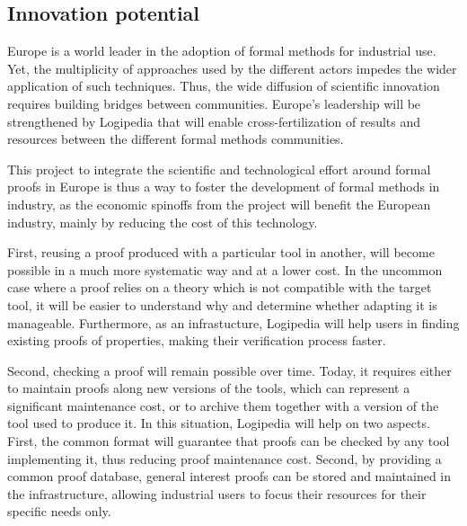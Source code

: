\subsection*{Innovation potential}

Europe is a world leader in the adoption of formal methods for
industrial use. Yet, the multiplicity of approaches used by the
different actors impedes the wider application of such
techniques. Thus, the wide diffusion of scientific innovation requires
building bridges between communities. Europe's leadership will be
strengthened by Logipedia that will enable cross-fertilization of
results and resources between the different formal methods
communities.

This project to integrate the scientific and technological effort
around formal proofs in Europe is thus a way to foster the development
of formal methods in industry, as the economic spinoffs from the
project will benefit the European industry, mainly by reducing the
cost of this technology. 

First, reusing a proof produced with a particular tool in another, 
will become possible in a much more systematic way and at a
lower cost. In the uncommon case where a proof relies on a theory
which is not compatible with the target tool, it will be easier to
understand why and determine whether adapting it is manageable.
Furthermore, as an infrastucture, Logipedia will help users
in finding existing proofs of properties, making their verification
process faster.

Second, checking a proof will remain possible over time. Today, it
requires either to maintain proofs along new versions of the tools,
which can represent a significant maintenance cost, or to archive
them together with a version of the tool used to produce it. In this
situation, Logipedia will help on two aspects. First, the
common format will guarantee that proofs can be checked by any tool
implementing it, thus reducing proof maintenance cost. Second, by
providing a common proof database, general interest proofs can be
stored and maintained in the infrastructure, allowing industrial users
to focus their resources for their specific needs only.

